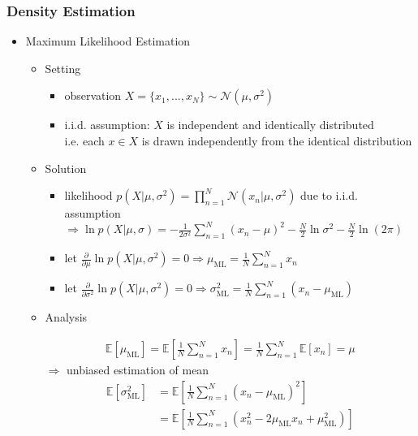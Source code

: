 \subsubsection{Density Estimation}
\begin{itemize}
\item Maximum Likelihood Estimation
	\begin{itemize}
	\item Setting
		\begin{itemize}
		\item observation $X=\{ x_1, ..., x_N \} \sim \mathcal N(\mu, \sigma^2)$
		\item i.i.d. assumption: $X$ is independent and identically distributed \\
		i.e. each $x\in X$ is drawn independently from the identical distribution
		\end{itemize}
	\item Solution
		\begin{itemize}
		\item likelihood $\displaystyle p(X|\mu, \sigma^2) = \prod_{n=1}^N \mathcal N(x_n | \mu, \sigma^2)$ due to i.i.d. assumption \\
		$\displaystyle \Rightarrow \ln p(X|\mu,\sigma) = -\frac 1{2\sigma^2} \sum_{n=1}^N(x_n-\mu)^2 -\frac N2 \ln \sigma^2 -\frac N2 \ln (2\pi)$
		\item let $\displaystyle \frac {\partial}{\partial \mu} \ln p(X|\mu,\sigma^2) = 0 \Rightarrow \mu_{\text{ML}}=\frac 1N \sum_{n=1}^Nx_n $
		\item let $\displaystyle \frac {\partial}{\partial \sigma^2} \ln p(X|\mu,\sigma^2)=0 \Rightarrow \sigma_\text{ML}^2 = \frac 1N \sum_{n=1}^N (x_n- \mu_\text{ML})$
		\end{itemize}
	\item Analysis
		\begin{itemize}
		\Item \begin{align*} \displaystyle \mathbb E[\mu_\text{ML}] = \mathbb E[\frac 1N \sum_{n=1}^Nx_n] = \frac 1N \sum_{n=1}^N \mathbb E[x_n] = \mu \tag{as \(x_1,...,x_N\) i.i.d, drawn from \(\mathcal N(\mu,\sigma^2)\), thus \(\sim \mathcal N(\mu,\sigma^2)\)} \end{align*}
		$\Rightarrow$ unbiased estimation of mean
		\Item \begin{align*} \mathbb E[\sigma_\text{ML}^2] &= \mathbb E[\frac 1N \sum_{n=1}^N(x_n-\mu_{\text{ML}})^2] \\
		&= \mathbb E [ \frac 1N \sum_{n=1}^{N}(x_n^2-2\mu_\text{ML}x_n+\mu_\text{ML}^2) ] \\ 

\end{align*}
\end{itemize}
\end{itemize}
\end{itemize}
